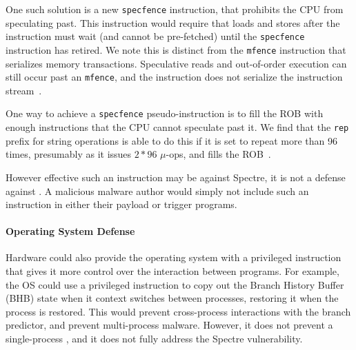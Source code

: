 One such solution is a new \texttt{specfence} instruction, that prohibits the
CPU from speculating past. This instruction would require that loads and stores after
the instruction must wait (and cannot be pre-fetched) until the
\texttt{specfence} instruction has retired. We note this is distinct from the
\texttt{mfence} instruction that serializes memory transactions. Speculative
reads and out-of-order execution can still occur past an \texttt{mfence}, and
the instruction does not serialize the instruction
stream~\cite{intel-software-guide}.

One way to achieve a \texttt{specfence} pseudo-instruction is to fill the ROB
with enough instructions that the CPU cannot speculate past it. We find that the
\texttt{rep} prefix for string operations is able to do this if it is set to 
repeat more than 96 times, presumably as it issues $2*96$ $\mu$-ops, and fills the
ROB~\cite{intel-instruction-tables}.

However effective such an instruction may be against Spectre, it is not a
defense against \speculake. A malicious \speculake malware author would simply
not include such an instruction in either their payload or trigger programs.


\paragraph{Operating System Defense}
Hardware could also provide the operating system with a privileged instruction
that gives it more control over the interaction between programs. For example,
the OS could use a privileged instruction to copy out the Branch History Buffer
(BHB) state when it context switches between processes, restoring it when the
process is restored. This would prevent cross-process interactions with the
branch predictor, and prevent multi-process \speculake malware. However, it does
not prevent a single-process \speculake, and it does not fully address the
Spectre vulnerability.



